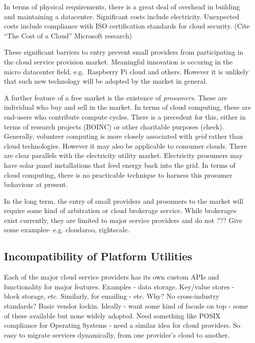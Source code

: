 \documentclass[conference,10pt]{IEEEtran}
\begin{document}
In terms of physical requirements, there is a great deal of overhead in building and maintaining a datacenter. Significant costs include electricity. Unexpected costs include compliance with ISO certification standards for cloud security. (Cite ``The Cost of a Cloud'' Microsoft research)

These significant barriers to entry prevent small providers from participating in the cloud service provision market. Meaningful innovation is occuring in the micro datacenter field, e.g.\ Raspberry Pi cloud and others.
However it is unlikely that such new technology will be adopted by the market in general.


A further feature of a free market is the existence of \emph{prosumers}. These are individual who buy and sell in the market. In terms of cloud computing, these are end-users who contribute compute cycles. There is a precedent for this, either in terms of research projects (BOINC) or other charitable purposes (check). Generally, volunteer computing is more closely associated with \emph{grid} rather than cloud technologies. However it may also be applicable to consumer clouds. There are clear parallels with the electricity utility market. Electricity prosumers may have solar panel installations that feed energy back into the grid. In terms of cloud computing, there is no practicable technique to harness this prosumer behaviour at present.

In the long term, the entry of small providers and prosumers to the market will require some kind of arbitration or cloud brokerage service. While brokerages exist currently, they are limited to major service providers and do not 
???
Give some examples- e.g. cloudaroo, rightscale.


\subsection{Incompatibility of Platform Utilities}

Each of the major cloud service providers has its own custom APIs and functionality for major features. Examples - data storage. Key/value stores - block storage, etc. Similarly, for emailing - etc. 
Why? No cross-industry standards? 
Basic vendor lockin. Ideally - want some kind of facade on top - some of these available but none widely adopted. Need something like POSIX compliance for Operating Systems - need a similar idea for cloud providers.
So easy to migrate services dynamically, from one provider's cloud to another.
\end{document}
